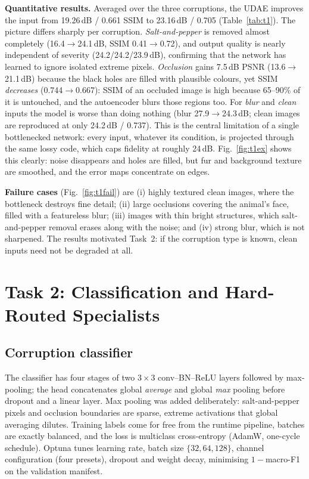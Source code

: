 \documentclass[conference]{IEEEtran}
\begin{document}
\textbf{Quantitative results.} Averaged over the three corruptions, the UDAE improves the input from 19.26\,dB / 0.661 SSIM to 23.16\,dB / 0.705 (Table~\ref{tab:t1}). The picture differs sharply per corruption. \emph{Salt-and-pepper} is removed almost completely (16.4$\to$24.1\,dB, SSIM 0.41$\to$0.72), and output quality is nearly independent of severity (24.2/24.2/23.9\,dB), confirming that the network has learned to ignore isolated extreme pixels. \emph{Occlusion} gains 7.5\,dB PSNR (13.6$\to$21.1\,dB) because the black holes are filled with plausible colours, yet SSIM \emph{decreases} (0.744$\to$0.667): SSIM of an occluded image is high because 65--90\% of it is untouched, and the autoencoder blurs those regions too. For \emph{blur} and \emph{clean} inputs the model is worse than doing nothing (blur 27.9$\to$24.3\,dB; clean images are reproduced at only 24.2\,dB / 0.737). This is the central limitation of a single bottlenecked network: every input, whatever its condition, is projected through the same lossy code, which caps fidelity at roughly 24\,dB. Fig.~\ref{fig:t1ex} shows this clearly: noise disappears and holes are filled, but fur and background texture are smoothed, and the error maps concentrate on edges.

\textbf{Failure cases} (Fig.~\ref{fig:t1fail}) are (i) highly textured clean images, where the bottleneck destroys fine detail; (ii) large occlusions covering the animal's face, filled with a featureless blur; (iii) images with thin bright structures, which salt-and-pepper removal erases along with the noise; and (iv) strong blur, which is not sharpened. The results motivated Task~2: if the corruption type is known, clean inputs need not be degraded at all.


\section{Task 2: Classification and Hard-Routed Specialists}
\subsection{Corruption classifier}
The classifier has four stages of two $3{\times}3$ conv--BN--ReLU layers followed by max-pooling; the head concatenates global \emph{average} and global \emph{max} pooling before dropout and a linear layer. Max pooling was added deliberately: salt-and-pepper pixels and occlusion boundaries are sparse, extreme activations that global averaging dilutes. Training labels come for free from the runtime pipeline, batches are exactly balanced, and the loss is multiclass cross-entropy (AdamW, one-cycle schedule). Optuna tunes learning rate, batch size $\{32,64,128\}$, channel configuration (four presets), dropout and weight decay, minimising $1-$macro-F1 on the validation manifest.
\end{document}
